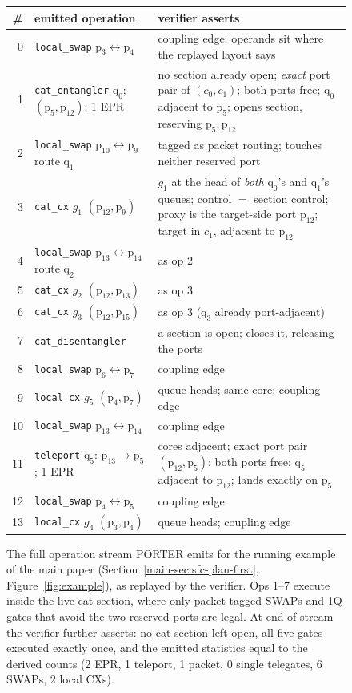 \documentclass[journal]{IEEEtran}
\newcommand{\PORTER}{\textsc{PORTER}}
\newcommand{\logi}[1]{\mathrm{q}_{#1}}
\newcommand{\phys}[1]{\mathrm{p}_{#1}}
\newcommand{\mainRunningExample}{Section~\ref{main-sec:sfc-plan-first}}
\newcommand{\mainExampleFig}{Figure~\ref{fig:example}}
\begin{document}
\begin{figure}[t]
\centering
\scriptsize
\setlength{\tabcolsep}{3.5pt}
\begin{tabular}{@{}r l p{3.8cm}@{}}
\toprule
\# & emitted operation & verifier asserts \\
\midrule
0 & \texttt{local\_swap} $\phys{3}{\leftrightarrow}\phys{4}$ &
    coupling edge; operands sit where the replayed layout says \\
\midrule
1 & \texttt{cat\_entangler} $\logi{0}$; $(\phys{5},\phys{12})$; 1 EPR &
    no section already open; \emph{exact} port pair of $(c_0,c_1)$;
    both ports free; $\logi{0}$ adjacent to $\phys{5}$; opens section,
    reserving $\phys{5},\phys{12}$ \\
2 & \texttt{local\_swap} $\phys{10}{\leftrightarrow}\phys{9}$ \hfill route $\logi{1}$ &
    tagged as packet routing; touches neither reserved port \\
3 & \texttt{cat\_cx} $g_1$ $(\phys{12},\phys{9})$ &
    $g_1$ at the head of \emph{both} $\logi{0}$'s and $\logi{1}$'s
    queues; control $=$ section control; proxy is the target-side
    port $\phys{12}$; target in $c_1$, adjacent to $\phys{12}$ \\
4 & \texttt{local\_swap} $\phys{13}{\leftrightarrow}\phys{14}$ \hfill route $\logi{2}$ &
    as op 2 \\
5 & \texttt{cat\_cx} $g_2$ $(\phys{12},\phys{13})$ & as op 3 \\
6 & \texttt{cat\_cx} $g_3$ $(\phys{12},\phys{15})$ &
    as op 3 ($\logi{3}$ already port-adjacent) \\
7 & \texttt{cat\_disentangler} &
    a section is open; closes it, releasing the ports \\
\midrule
8 & \texttt{local\_swap} $\phys{6}{\leftrightarrow}\phys{7}$ & coupling edge \\
9 & \texttt{local\_cx} $g_5$ $(\phys{4},\phys{7})$ &
    queue heads; same core; coupling edge \\
10 & \texttt{local\_swap} $\phys{13}{\leftrightarrow}\phys{14}$ & coupling edge \\
11 & \texttt{teleport} $\logi{5}$: $\phys{13}{\to}\phys{5}$; 1 EPR &
    cores adjacent; exact port pair $(\phys{12},\phys{5})$; both
    ports free; $\logi{5}$ adjacent to $\phys{12}$; lands exactly on
    $\phys{5}$ \\
12 & \texttt{local\_swap} $\phys{4}{\leftrightarrow}\phys{5}$ & coupling edge \\
13 & \texttt{local\_cx} $g_4$ $(\phys{3},\phys{4})$ &
    queue heads; coupling edge \\
\bottomrule
\end{tabular}
\caption{The full operation stream \PORTER{} emits for the running
  example of the main paper (\mainRunningExample{},
  \mainExampleFig{}), as replayed by the verifier.
  Ops 1--7 execute inside the live cat section, where only
  packet-tagged SWAPs and 1Q gates that avoid the two reserved ports
  are legal. At end of stream the verifier further asserts: no cat
  section left open, all five gates executed exactly once, and the
  emitted statistics equal to the derived counts (2 EPR, 1 teleport,
  1 packet, 0 single telegates, 6 SWAPs, 2 local CXs).}
\label{fig:trace}
\end{figure}
\end{document}
